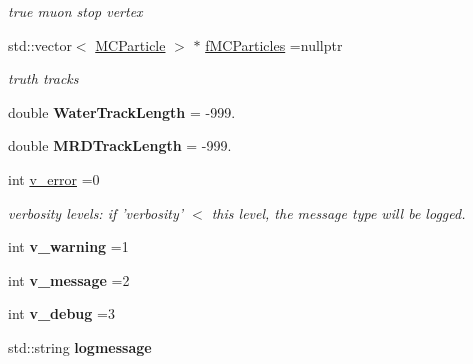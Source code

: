 \begin{DoxyCompactItemize}
\begin{DoxyCompactList}\small\item\em true muon stop vertex \end{DoxyCompactList}\item 
\hypertarget{classMCRecoEventLoader_a92922e07f398c491b9fd9e13ef012689}{std\-::vector$<$ \hyperlink{classMCParticle}{M\-C\-Particle} $>$ $\ast$ \hyperlink{classMCRecoEventLoader_a92922e07f398c491b9fd9e13ef012689}{f\-M\-C\-Particles} =nullptr}\label{classMCRecoEventLoader_a92922e07f398c491b9fd9e13ef012689}

\begin{DoxyCompactList}\small\item\em truth tracks \end{DoxyCompactList}\item 
\hypertarget{classMCRecoEventLoader_aca4904cc6f45b2dd128ac58faa6c060d}{double {\bfseries Water\-Track\-Length} = -\/999.}\label{classMCRecoEventLoader_aca4904cc6f45b2dd128ac58faa6c060d}

\item 
\hypertarget{classMCRecoEventLoader_a9460d1064fa3c64c723dec37c834b75b}{double {\bfseries M\-R\-D\-Track\-Length} = -\/999.}\label{classMCRecoEventLoader_a9460d1064fa3c64c723dec37c834b75b}

\item 
\hypertarget{classMCRecoEventLoader_a402d61b93cd42d10500aedeb6e534b5d}{int \hyperlink{classMCRecoEventLoader_a402d61b93cd42d10500aedeb6e534b5d}{v\-\_\-error} =0}\label{classMCRecoEventLoader_a402d61b93cd42d10500aedeb6e534b5d}

\begin{DoxyCompactList}\small\item\em verbosity levels\-: if 'verbosity' $<$ this level, the message type will be logged. \end{DoxyCompactList}\item 
\hypertarget{classMCRecoEventLoader_a4693e8478a38f832b1ea3daff98353a9}{int {\bfseries v\-\_\-warning} =1}\label{classMCRecoEventLoader_a4693e8478a38f832b1ea3daff98353a9}

\item 
\hypertarget{classMCRecoEventLoader_a2e5d293cda46249cbab52275bd52c508}{int {\bfseries v\-\_\-message} =2}\label{classMCRecoEventLoader_a2e5d293cda46249cbab52275bd52c508}

\item 
\hypertarget{classMCRecoEventLoader_a1dd2e7e0076fafe88a4baa4218f772a0}{int {\bfseries v\-\_\-debug} =3}\label{classMCRecoEventLoader_a1dd2e7e0076fafe88a4baa4218f772a0}

\item 
\hypertarget{classMCRecoEventLoader_a1c2cc6580cbfcad49ea1cd17e7ce08f3}{std\-::string {\bfseries logmessage}}\label{classMCRecoEventLoader_a1c2cc6580cbfcad49ea1cd17e7ce08f3}

\end{DoxyCompactItemize}


